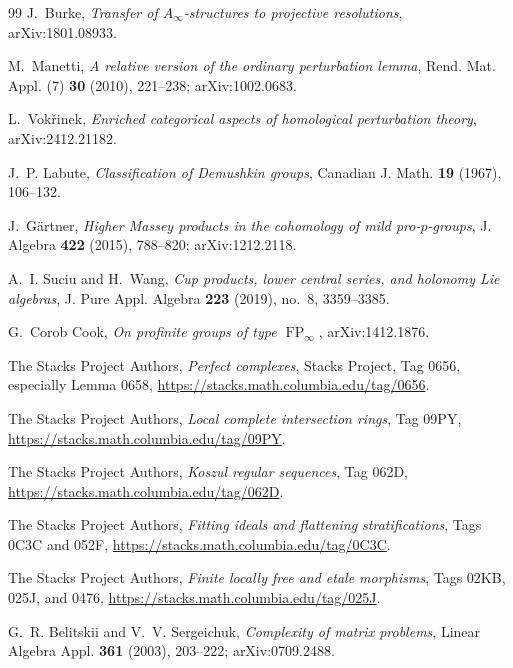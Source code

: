 \documentclass[11pt]{article}
\theoremstyle{definition}
\begin{document}
\begin{thebibliography}{99}
J.~Burke,
\emph{Transfer of $A_\infty$-structures to projective resolutions},
arXiv:1801.08933.

M.~Manetti,
\emph{A relative version of the ordinary perturbation lemma},
Rend. Mat. Appl. (7) \textbf{30} (2010), 221--238; arXiv:1002.0683.

L.~Vok\v{r}inek,
\emph{Enriched categorical aspects of homological perturbation theory},
arXiv:2412.21182.

J.~P. Labute,
\emph{Classification of Demushkin groups},
Canadian J. Math. \textbf{19} (1967), 106--132.

J.~G\"artner,
\emph{Higher Massey products in the cohomology of mild pro-$p$-groups},
J. Algebra \textbf{422} (2015), 788--820; arXiv:1212.2118.

A.~I. Suciu and H.~Wang,
\emph{Cup products, lower central series, and holonomy Lie algebras},
J. Pure Appl. Algebra \textbf{223} (2019), no.~8, 3359--3385.

G.~Corob Cook,
\emph{On profinite groups of type $\operatorname{FP}_\infty$},
arXiv:1412.1876.

The Stacks Project Authors,
\emph{Perfect complexes},
Stacks Project, Tag 0656, especially Lemma 0658,
\url{https://stacks.math.columbia.edu/tag/0656}.

The Stacks Project Authors,
\emph{Local complete intersection rings},
Tag 09PY,
\url{https://stacks.math.columbia.edu/tag/09PY}.

The Stacks Project Authors,
\emph{Koszul regular sequences},
Tag 062D,
\url{https://stacks.math.columbia.edu/tag/062D}.

The Stacks Project Authors,
\emph{Fitting ideals and flattening stratifications},
Tags 0C3C and 052F,
\url{https://stacks.math.columbia.edu/tag/0C3C}.


The Stacks Project Authors,
\emph{Finite locally free and etale morphisms},
Tags 02KB, 025J, and 0476,
\url{https://stacks.math.columbia.edu/tag/025J}.

G.~R. Belitskii and V.~V. Sergeichuk,
\emph{Complexity of matrix problems},
Linear Algebra Appl. \textbf{361} (2003), 203--222; arXiv:0709.2488.


\end{thebibliography}
\end{document}
